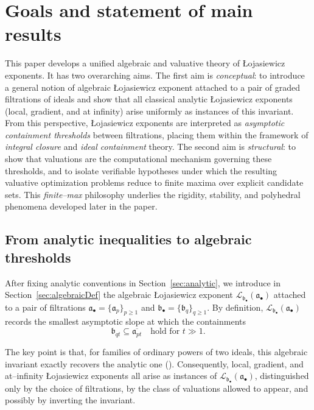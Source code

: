 \documentclass[12pt]{amsart}
\renewcommand{\a}{\mathfrak{a}}
\renewcommand{\b}{\mathfrak{b}}
\newcommand{\Loj}{\mathcal{L}} %
\newcommand{\abul}{{\a_\bullet}}
\newcommand{\bbul}{{\b_\bullet}}
\theoremstyle{plain}
\theoremstyle{definition}
\numberwithin{equation}{section}
\begin{document}


\section{Goals and statement of main results}\label{sec:mainResults}

This paper develops a unified algebraic and valuative theory of \L{}ojasiewicz exponents. It has two overarching aims.
The first aim is \emph{conceptual}:
to introduce a general notion of algebraic \L{}ojasiewicz exponent attached to a pair of graded filtrations of ideals and show that all classical analytic \L{}ojasiewicz exponents (local, gradient, and at infinity) arise uniformly as instances of this invariant. From this perspective, \L{}ojasiewicz exponents are interpreted as \emph{asymptotic containment thresholds} between filtrations, placing them within the framework of \emph{integral closure} and \emph{ideal containment} theory. 
The second aim is \emph{structural}:
to show that valuations are the computational mechanism governing these thresholds, and
to isolate verifiable hypotheses under which the resulting valuative optimization problems
reduce to finite maxima over explicit candidate sets.
This \emph{finite--max} philosophy underlies the rigidity, stability, and polyhedral phenomena
developed later in the paper.

\subsection{From analytic inequalities to algebraic thresholds}

After fixing analytic conventions in Section~\ref{sec:analytic}, we introduce in
Section~\ref{sec:algebraicDef} the algebraic \L{}ojasiewicz exponent
$\Loj_{\bbul}(\abul)$ attached to a pair of filtrations
$\abul=\{\a_p\}_{p\ge1}$ and $\bbul=\{\b_q\}_{q\ge1}$.
By definition, $\Loj_{\bbul}(\abul)$ records the smallest asymptotic slope at which the
containments
\[
\b_{qt}\subseteq \overline{\a_{pt}}
\quad\text{hold for } t\gg1 .
\]

The key point is that, for families of ordinary powers of two ideals, this algebraic invariant exactly recovers the analytic one ().
Consequently, local, gradient, and at--infinity \L{}ojasiewicz exponents all arise as
instances of $\Loj_{\bbul}(\abul)$, distinguished only by the choice of filtrations, by the class of valuations allowed to appear, and possibly by inverting the invariant.
\end{document}
